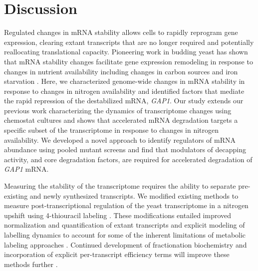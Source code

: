 \section{Discussion}

Regulated changes in mRNA stability allows cells to rapidly reprogram
gene expression, clearing extant transcripts that are no longer
required and potentially reallocating translational capacity.
Pioneering work in budding yeast has shown that mRNA
stability changes facilitate gene expression remodeling in response to
changes in nutrient availability including changes in carbon sources
\parencite{scheffler1998control} and iron starvation
\parencite{puig2005coordinated}. 
Here, we characterized genome-wide changes
in mRNA stability in response to changes in nitrogen availability and
identified factors that mediate the rapid repression of the
destabilized mRNA, \textit{GAP1}. Our study extends our previous work
characterizing the dynamics of transcriptome changes using chemostat
cultures \parencite{airoldi2016steady} and shows that accelerated mRNA
degradation targets a specific subset of the transcriptome in response
to changes in nitrogen availability. We developed a novel approach to
identify regulators of mRNA abundance using pooled mutant screens and
find that modulators of decapping activity, and core degradation
factors, are required for accelerated degradation of 
\textit{GAP1} mRNA. 
 
Measuring the stability of the transcriptome requires the ability to
separate pre-existing and newly synthesized transcripts. We modified
existing methods to measure 
post-transcriptional regulation of the yeast transcriptome in a
nitrogen upshift using 4-thiouracil labeling
\parencite{miller2011dynamic,neymotin2014determination,munchel2011dynamic}. These
modifications entailed improved normalization and quantification of
extant transcripts and explicit modeling of labelling dynamics to
account for some of the inherent limitations of metabolic labeling
approaches \parencite{perez2013eukaryotic}. Continued development of
fractionation biochemistry \parencite{duffy2015tracking} and incorporation of
explicit per-transcript efficiency terms will improve these
methods further \parencite{chan2017non}.

